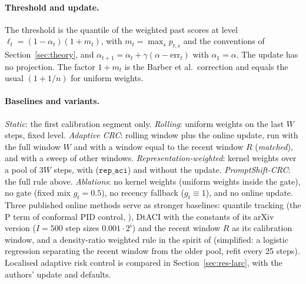 \paragraph{Threshold and update.}
The threshold is the quantile of the weighted past scores at level $\ell_t=(1-\alpha_t)(1+m_t)$, with $m_t=\max_s p_{t,s}$ and the conventions of Section~\ref{sec:theory}, and $\alpha_{t+1}=\alpha_t+\gamma(\alpha-\mathrm{err}_t)$ with $\alpha_1=\alpha$. The update has no projection. The factor $1+m_t$ is the Barber et al.\ correction and equals the usual $(1+1/n)$ for uniform weights.

\paragraph{Baselines and variants.}
\emph{Static}: the first calibration segment only. \emph{Rolling}: uniform weights on the last $W$ steps, fixed level. \emph{Adaptive CRC}: rolling window plus the online update, run with the full window $W$ and with a window equal to the recent window $R$ (\emph{matched}), and with a sweep of other windows. \emph{Representation-weighted}: kernel weights over a pool of $3W$ steps, with ($\texttt{rep\_aci}$) and without the update. \emph{PromptShift-CRC}: the full rule above. \emph{Ablations}: no kernel weights (uniform weights inside the gate), no gate (fixed mix $g_t=0.5$), no recency fallback ($g_t\equiv1$), and no online update. Three published online methods serve as stronger baselines: quantile tracking (the P term of conformal PID control, \citealp{angelopoulos2023pid}), DtACI \citep{gibbs2024online} with the constants of its arXiv version ($I=500$ step sizes $0.001\cdot 2^i$) and the recent window $R$ as its calibration window, and a density-ratio weighted rule in the spirit of \citet{lin2026domain,hu2026cofact} (simplified: a logistic regression separating the recent window from the older pool, refit every 25 steps). Localised adaptive risk control \citep{zecchin2024localized} is compared in Section~\ref{sec:res-larc}, with the authors' update and defaults.
